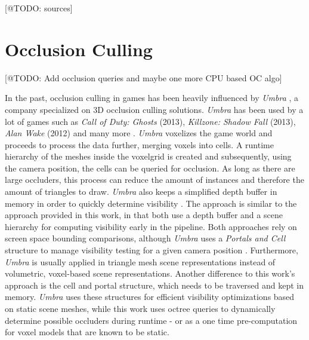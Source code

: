 [@TODO: sources]


\section{Occlusion Culling}

[@TODO: Add occlusion queries and maybe one more CPU based OC algo]

In the past, occlusion culling in games has been heavily influenced by \emph{Umbra} \cite{Umbra2024}, a company 
specialized on 3D occlusion culling solutions. \emph{Umbra} has been used by a lot of games such as 
\emph{Call of Duty: Ghosts} (2013), \emph{Killzone: Shadow Fall} (2013), \emph{Alan Wake} (2012) and many more 
\cite{UmbraWiki,CallOfDutyGhostsCredits,KillzoneUmbra,AlanWakeUmbra}. \emph{Umbra} voxelizes the game world and proceeds 
to process the data further, merging voxels into cells. A runtime hierarchy of the meshes inside the voxelgrid is created 
and subsequently, using the camera position, the cells can be queried for occlusion. As long as there are large 
occluders, this process can reduce the amount of instances and therefore the amount of triangles to draw. \emph{Umbra} 
also keeps a simplified depth buffer in memory in order to quickly determine visibility \cite{Medium2018}. The 
approach is similar to the approach provided in this work, in that both use a depth buffer and a scene hierarchy for 
computing visibility early in the pipeline. Both approaches rely on screen space bounding comparisons, although 
\emph{Umbra} uses a \emph{Portals and Cell} structure to manage visibility testing for a given camera position 
\cite{Medium2018}. Furthermore, \emph{Umbra} is usually applied in triangle mesh scene representations instead of 
volumetric, voxel-based scene representations. Another difference to this work's approach is the cell and portal 
structure, which needs to be traversed and kept in memory. \emph{Umbra} uses these structures for efficient 
visibility optimizations based on static scene meshes, while this work uses octree queries to dynamically determine 
possible occluders during runtime - or as a one time pre-computation for voxel models that are known to be static. \\

